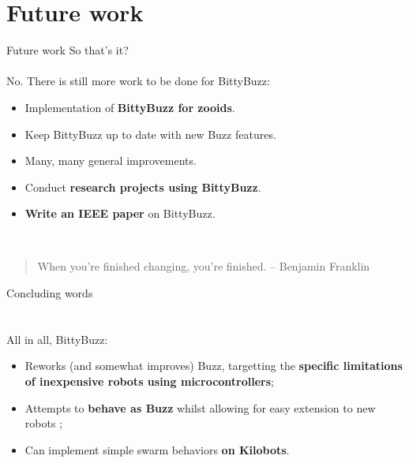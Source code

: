 \documentclass{beamer}
\begin{document}
	\section{Future work}
	\begin{frame}{Future work}
		So that's it?\\
		~\\
		No. There is still more work to be done for BittyBuzz:
		\begin{itemize}
			\item Implementation of \textbf{BittyBuzz for zooids}.
			\item Keep BittyBuzz up to date with new Buzz features.
			\item Many, many general improvements.
			\item Conduct \textbf{research projects using BittyBuzz}.
			\item \textbf{Write an IEEE paper} on BittyBuzz.
		\end{itemize}
		~\\
		\begin{quote}
			When you're finished changing, you're finished. -- Benjamin Franklin
		\end{quote}
	\end{frame}
	\begin{frame}{Concluding words}
		\section{}
		All in all, BittyBuzz:
		\begin{itemize}
			\item Reworks (and somewhat improves) Buzz, targetting the \textbf{specific limitations of inexpensive robots using microcontrollers};
			\item Attempts to \textbf{behave as Buzz} whilst allowing for easy extension to new robots ;
			\item Can implement simple swarm behaviors \textbf{on Kilobots}.
		\end{itemize}
	\end{frame}
\end{document}
